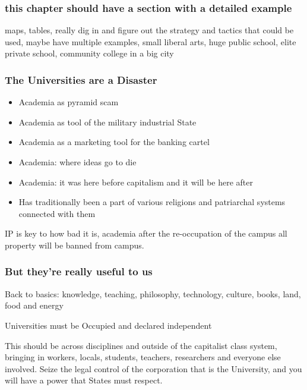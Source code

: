 \subsubsection{this chapter should have a section with a detailed
example}\label{this-chapter-should-have-a-section-with-a-detailed-example}

maps, tables, really dig in and figure out the strategy and tactics that
could be used, maybe have multiple examples, small liberal arts, huge
public school, elite private school, community college in a big city

\subsubsection{The Universities are a
Disaster}\label{the-universities-are-a-disaster}

\begin{itemize}
\item
  Academia as pyramid scam
\item
  Academia as tool of the military industrial State
\item
  Academia as a marketing tool for the banking cartel
\item
  Academia: where ideas go to die
\item
  Academia: it was here before capitalism and it will be here after
\item
  Has traditionally been a part of various religions and patriarchal
  systems connected with them
\end{itemize}

IP is key to how bad it is, academia after the re-occupation of the
campus all property will be banned from campus.

\subsubsection{But they're really useful to
us}\label{but-theyre-really-useful-to-us}

Back to basics: knowledge, teaching, philosophy, technology, culture,
books, land, food and energy

Universities must be Occupied and declared independent

This should be across disciplines and outside of the capitalist class
system, bringing in workers, locals, students, teachers, researchers and
everyone else involved. Seize the legal control of the corporation that
is the University, and you will have a power that States must respect.

